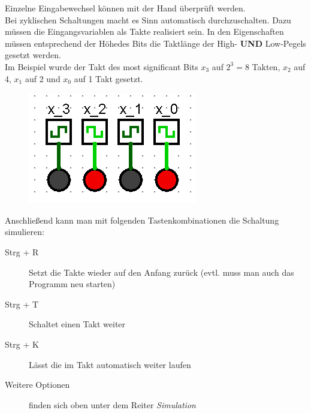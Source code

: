\documentclass[a4paper]{scrartcl}
\begin{document}
	Einzelne Eingabewechsel können mit der Hand überprüft werden. \\
	Bei zyklischen Schaltungen macht es Sinn automatisch durchzuschalten.
	Dazu müssen die Eingangsvariablen als Takte realisiert sein. In den Eigenschaften müssen entsprechend der \glqq Höhe\grqq des Bits die Taktlänge der High- \textbf{UND} Low-Pegels gesetzt werden. \\
	Im Beispiel wurde der Takt des most significant Bits $x_3$ auf $2^3 = 8$ Takten, $x_2$ auf 4, $x_1$ auf 2 und $x_0$ auf 1 Takt gesetzt.
	\begin{figure}[H]
		\centering
		\includegraphics[]{Simulation.png}
	\end{figure} 
	
	Anschließend kann man mit folgenden Tastenkombinationen die Schaltung simulieren: \\
	\begin{description}
		\item[Strg + R] Setzt die Takte wieder auf den Anfang zurück (evtl. muss man auch das Programm neu starten)
		\item[Strg + T] Schaltet einen Takt weiter
		\item[Strg + K] Lässt die im Takt automatisch weiter laufen
		\item[Weitere Optionen] finden sich oben unter dem Reiter \textit{Simulation}
	\end{description}
	
\end{document}
